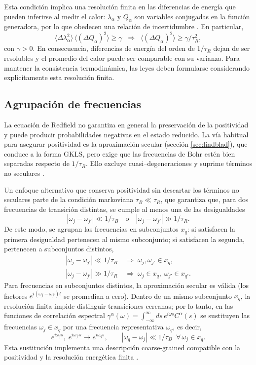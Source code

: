 Esta condición implica una resolución finita en las diferencias de energía que pueden inferirse al medir el calor: \(\lambda_{\alpha}\) y \(Q_{\alpha}\) son variables conjugadas en la función generadora, por lo que obedecen una relación de incertidumbre \cite{folland1997uncertainty}. En particular,
\[
    \langle \Delta \lambda^{2}_{\alpha} \rangle\,\langle (\Delta Q_{\alpha})^{2}\rangle \ge \gamma
    \;\;\Rightarrow\;\;
    \langle (\Delta Q_{\alpha})^{2}\rangle \ge \gamma/\tau_{R}^{2},
\]
con \(\gamma>0\). En consecuencia, diferencias de energía del orden de \(1/\tau_{R}\) dejan de ser resolubles y el promedio del calor puede ser comparable con su varianza. Para mantener la consistencia termodinámica, las leyes deben formularse considerando explícitamente esta resolución finita.
\label{sec2:finiteresol}

\subsection{Agrupación de frecuencias}

La ecuación de Redfield no garantiza en general la preservación de la positividad y puede producir probabilidades negativas en el estado reducido. La vía habitual para asegurar positividad es la aproximación secular (sección \ref{sec:lindblad}), que conduce a la forma GKLS, pero exige que las frecuencias de Bohr estén bien separadas respecto de \(1/\tau_{R}\). Ello excluye cuasi–degeneraciones y suprime términos no seculares \cite{trushechkin2021unified}.

Un enfoque alternativo que conserva positividad sin descartar los términos no seculares parte de la condición markoviana \(\tau_{B}\ll \tau_{R}\), que garantiza que, para dos frecuencias de transición distintas, se cumple al menos una de las desigualdades
\[
|\omega_j-\omega_{j'}|\ll 1/\tau_B
\quad\text{o}\quad
|\omega_j-\omega_{j'}|\gg 1/\tau_R.
\]
De este modo, se agrupan las frecuencias en subconjuntos \(x_q\): si satisfacen la primera desigualdad pertenecen al mismo subconjunto; si satisfacen la segunda, pertenecen a subconjuntos distintos,
\begin{align*}
    |\omega_{j}-\omega_{j'}| \ll 1/\tau_{B}  &\;\Rightarrow\; \omega_{j},\omega_{j'} \in x_{q}, \\
    |\omega_{j}-\omega_{j'}| \gg 1/\tau_{R}  &\;\Rightarrow\; \omega_{j} \in x_{q},\; \omega_{j'} \in x_{q'}.
\end{align*}
Para frecuencias en subconjuntos distintos, la aproximación secular es válida (los factores \(e^{i(\omega_j-\omega_{j'})t}\) se promedian a cero). Dentro de un mismo subconjunto \(x_q\), la resolución finita impide distinguir transiciones cercanas; por lo tanto, en las funciones de correlación espectral
\(\gamma^{\alpha}(\omega)=\int_{-\infty}^{\infty} ds\,e^{i\omega s}C^{\alpha}(s)\)
se sustituyen las frecuencias \(\omega_{j}\in x_q\) por una frecuencia representativa \(\omega_{q}\), es decir,
\[
    e^{i\omega_{j}s},\;e^{i\omega_{j'}s} \to e^{i\omega_{q}s},
    \qquad 
    |\omega_{q}-\omega_{j}|\ll 1/\tau_{B}\;\;\forall\,\omega_{j}\in x_{q}.
\]
Esta sustitución implementa una descripción coarse-grained compatible con la positividad y la resolución energética finita \cite{chruscinski2017brief}.

